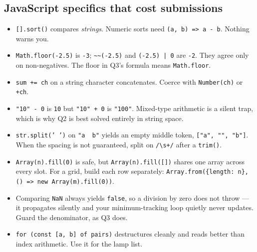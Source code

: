 \documentclass[11pt,a4paper]{article}
\begin{document}
\subsection*{JavaScript specifics that cost submissions}

\begin{itemize}
  \item \texttt{[].sort()} compares \emph{strings}. Numeric sorts need
        \texttt{(a, b) => a - b}. Nothing warns you.
  \item \texttt{Math.floor(-2.5)} is \texttt{-3}; \texttt{\textasciitilde\textasciitilde(-2.5)}
        and \texttt{(-2.5) | 0} are \texttt{-2}. They agree only on
        non-negatives. The floor in Q3's formula means \texttt{Math.floor}.
  \item \texttt{sum += ch} on a string character concatenates. Coerce with
        \texttt{Number(ch)} or \texttt{+ch}.
  \item \texttt{"10" - 0} is \texttt{10} but \texttt{"10" + 0} is
        \texttt{"100"}. Mixed-type arithmetic is a silent trap, which is why Q2
        is best solved entirely in string space.
  \item \texttt{str.split(' ')} on \texttt{"a\ \ b"} yields an empty middle
        token, \texttt{["a", "", "b"]}. When the spacing is not guaranteed,
        split on \texttt{/\textbackslash s+/} after a \texttt{trim()}.
  \item \texttt{Array(n).fill(0)} is safe, but
        \texttt{Array(n).fill([])} shares one array across every slot. For a
        grid, build each row separately:
        \texttt{Array.from(\{length: n\}, () => new Array(m).fill(0))}.
  \item Comparing \texttt{NaN} always yields \texttt{false}, so a division by
        zero does not throw --- it propagates silently and your minimum-tracking
        loop quietly never updates. Guard the denominator, as Q3 does.
  \item \texttt{for (const [a, b] of pairs)} destructures cleanly and reads
        better than index arithmetic. Use it for the lamp list.
\end{itemize}

\bigskip
{}
\end{document}
